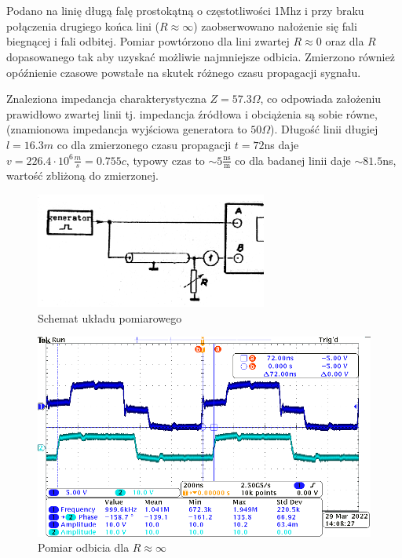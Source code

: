 \clearpage
\section{}
Podano na linię długą falę prostokątną o częstotliwości 1Mhz i przy braku połączenia drugiego końca lini (\(R\approx\infty\)) zaobserwowano nałożenie się fali biegnącej i fali odbitej.
Pomiar powtórzono dla lini zwartej \(R\approx0\) oraz dla \(R\) dopasowanego tak aby uzyskać możliwie najmniejsze odbicia.
Zmierzono również opóźnienie czasowe powstałe na skutek różnego czasu propagacji sygnału.

Znaleziona impedancja charakterystyczna \(Z=57.3\Omega\), co odpowiada założeniu prawidłowo zwartej linii tj. impedancja źródłowa i obciążenia są sobie równe, (znamionowa impedancja wyjściowa generatora to \(50\Omega\)).
Długość linii długiej \(l=16.3m\) co dla zmierzonego czasu propagacji \(t=72\)ns daje \(v=226.4\cdot10^{6}\frac{m}{s}=0.755c\), typowy czas to \(\sim5\frac{\text{ns}}{\text{m}}\) co dla badanej linii daje \(\sim81.5\)ns, wartość zbliżoną do zmierzonej.

\begin{figure}[H]
	\centering
	\includegraphics[width=3in]{include/5/sch.png}
	\caption{Schemat układu pomiarowego}
\end{figure}

\begin{figure}[H]
	\centering
	\includegraphics[width=\textwidth]{include/5/infR.png}
	\caption{Pomiar odbicia dla \(R\approx\infty\)}
\end{figure}

